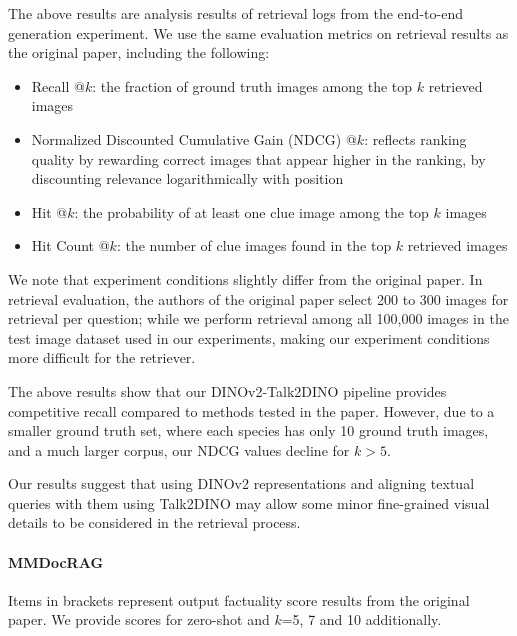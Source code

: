 The above results are analysis results of retrieval logs from the end-to-end generation experiment.
We use the same evaluation metrics on retrieval results as the original paper, including the following:
\begin{itemize}
    \item Recall @$k$: the fraction of ground truth images among the top $k$ retrieved images
    \item Normalized Discounted Cumulative Gain (NDCG) @$k$: reflects ranking quality by rewarding correct images that appear higher in the ranking,
            by discounting relevance logarithmically with position
    \item Hit @$k$: the probability of at least one clue image among the top $k$ images
    \item Hit Count @$k$: the number of clue images found in the top $k$ retrieved images
\end{itemize}

We note that experiment conditions slightly differ from the original paper.
In retrieval evaluation, the authors of the original paper select 200 to 300 images for retrieval per question;
while we perform retrieval among all 100,000 images in the test image dataset used in our experiments,
making our experiment conditions more difficult for the retriever.

The above results show that our DINOv2-Talk2DINO pipeline provides competitive recall compared to methods tested in the paper.
However, due to a smaller ground truth set, where each species has only 10 ground truth images, and a much larger corpus, 
our NDCG values decline for $k > 5$.

Our results suggest that using DINOv2 representations and aligning textual queries with them using Talk2DINO may allow some 
minor fine-grained visual details to be considered in the retrieval process.

\newpage
\paragraph{MMDocRAG}

Items in brackets represent output factuality score results from the original paper.
We provide scores for zero-shot and $k$=5, 7 and 10 additionally.

